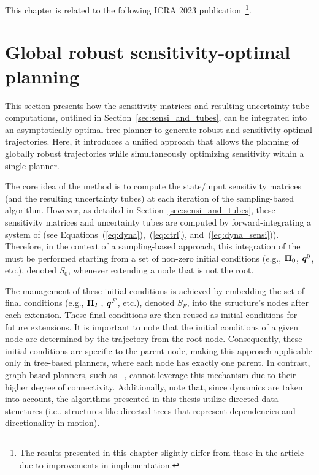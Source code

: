 This chapter is related to the following ICRA 2023 publication~\cite{cSAMP}\footnote{The results presented in this chapter slightly differ from those in the article due to improvements in implementation.}.

\section{Global robust sensitivity-optimal planning}\label{sec:samp}

This section presents how the sensitivity matrices and resulting uncertainty tube computations, outlined in Section~\ref{sec:sensi_and_tubes}, can be integrated into an asymptotically-optimal tree planner to generate robust and sensitivity-optimal trajectories. 
Here, it introduces a unified approach that allows the planning of globally robust trajectories while simultaneously optimizing sensitivity within a single planner.

The core idea of the method is to compute the state/input sensitivity matrices (and the resulting uncertainty tubes) at each iteration of the sampling-based algorithm. 
However, as detailed in Section~\ref{sec:sensi_and_tubes}, these sensitivity matrices and uncertainty tubes are computed by forward-integrating a system of  (see Equations~(\ref{eq:dyna}),~(\ref{eq:ctrl}), and~(\ref{eq:dyna_sensi})). 
Therefore, in the context of a sampling-based approach, this integration of the  must be performed starting from a set of non-zero initial conditions (e.g., $\boldsymbol{\Pi}_0$, $\boldsymbol{q}^0$, etc.), denoted $S_0$, whenever extending a node that is not the root.

The management of these initial conditions is achieved by embedding the set of final conditions (e.g., $\boldsymbol{\Pi}_F$, $\boldsymbol{q}^F$, etc.), denoted $S_F$, into the structure's nodes after each extension. 
These final conditions are then reused as initial conditions for future extensions. 
It is important to note that the initial conditions of a given node are determined by the trajectory from the root node. 
Consequently, these initial conditions are specific to the parent node, making this approach applicable only in tree-based planners, where each node has exactly one parent. 
In contrast, graph-based planners, such as ~\cite{cPRM}, cannot leverage this mechanism due to their higher degree of connectivity.
Additionally, note that, since dynamics are taken into account, the algorithms presented in this thesis utilize directed data structures (i.e., structures like directed trees that represent dependencies and directionality in motion).

